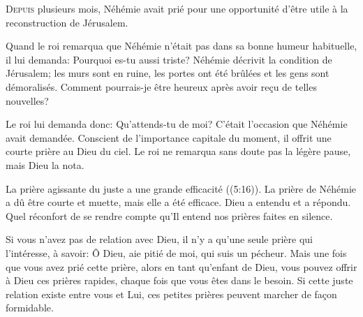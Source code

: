 \dvrule






\lettrine{D}{epuis} plusieurs mois, Néhémie avait prié
 pour une opportunité d'être utile à la reconstruction de Jérusalem.

Quand le roi remarqua que Néhémie n'était pas dans sa bonne humeur habituelle,
 il lui demanda: \Og Pourquoi es-tu aussi triste? \Fg{}
 Néhémie décrivit la condition de Jérusalem; les murs sont en ruine,
 les portes ont été brûlées et les gens sont démoralisés.
 \Og Comment pourrais-je être heureux après avoir re\c{c}u de telles nouvelles? \Fg{}

Le roi lui demanda donc: \Og Qu'attends-tu de moi? \Fg{}
 C'était l'occasion que Néhémie avait demandée.
 Conscient de l'importance capitale du moment,
 il offrit une courte prière au Dieu du ciel.
 Le roi ne remarqua sans doute pas la légère pause, mais Dieu la nota.


\Og La prière agissante du juste a une grande efficacité \Fg{}
 ((5:16)).
 La prière de Néhémie a dû être courte et muette, mais elle a été efficace.
 Dieu a entendu et a répondu.
 Quel réconfort de se rendre compte qu'Il entend nos prières faites en silence.

Si vous n'avez pas de relation avec Dieu, il n'y a qu'une seule prière
 qui l'intéresse, à savoir:
 \Og Ô Dieu, aie pitié de moi, qui suis un pécheur. \Fg{}
 Mais une fois que vous avez prié cette prière, alors en tant qu'enfant de Dieu,
 vous pouvez offrir à Dieu ces prières rapides,
 chaque fois que vous êtes dans le besoin.
 Si cette juste relation existe entre vous et Lui,
 ces petites prières peuvent marcher de fa\c{c}on formidable. 

\dvrule



